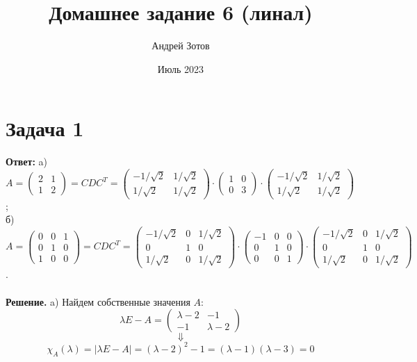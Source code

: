 \documentclass{article}
\title{Домашнее задание 6 (линал)}
\author{Андрей Зотов}
\date{Июль 2023}
\begin{document}
\maketitle
\section*{Задача 1}
{\bf Ответ:} a) $A=\left(\begin{array}{rr}2 & 1\\1 & 2\end{array}\right)=CDC^T=\left(\begin{array}{rr}-1/\sqrt{2} & 1/\sqrt{2}\\1/\sqrt{2} & 1/\sqrt{2}\end{array}\right)\cdot\left(\begin{array}{rr}1 & 0\\0 & 3\end{array}\right)\cdot\left(\begin{array}{rr}-1/\sqrt{2} & 1/\sqrt{2}\\1/\sqrt{2} & 1/\sqrt{2}\end{array}\right)$;
\\
б) $A=\left(\begin{array}{rrr}0 & 0 & 1\\0 & 1 & 0\\1 & 0 & 0\end{array}\right)=CDC^T=\left(\begin{array}{rrr}-1/\sqrt{2} & 0 & 1/\sqrt{2}\\0 & 1 & 0\\1/\sqrt{2} & 0 & 1/\sqrt{2}\end{array}\right)\cdot\left(\begin{array}{rrr}-1 & 0 & 0\\0 & 1 & 0\\0 & 0 & 1\end{array}\right)\cdot\left(\begin{array}{rrr}-1/\sqrt{2} & 0 & 1/\sqrt{2}\\0 & 1 & 0\\1/\sqrt{2} & 0 & 1/\sqrt{2}\end{array}\right)$.
\\
\\
{\bf Решение.} a) Найдем собственные значения $A$:
$$\lambda E - A = \left(\begin{array}{cc}\lambda-2 & -1\\-1 & \lambda-2\end{array}\right)$$
$$\Downarrow$$
$$\chi_{A}(\lambda)=|\lambda E - A |=(\lambda-2)^2-1=(\lambda-1)(\lambda-3)=0$$
\end{document}
